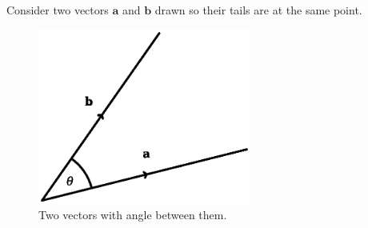 \documentclass[12pt,a4paper]{article}
\newcommand{\gm}{0.625}
\newcommand{\gm}{0.5}
\newcommand{\nextalt}[1]{}
\theoremstyle{clearprint}
\newcommand{\bvec}[1]{\mathrm{\mathbf{#1}}}
\begin{document}
Consider two vectors \(\bvec{a}\) and \(\bvec{b}\) drawn so their tails are at the same point. 
\begin{figure}[!h]
\begin{center}
\nextalt{Two vectors, labelled a and b, are drawn as line segments. Their start points coincide and their end points do not. There is an acute angle of theta between them. Each line segment has an arrow on it pointing from the start point to the end point.}
\includegraphics[width=\gm\textwidth]{vectors.eps}
\end{center}
\caption{Two vectors with angle between them.}
\label{vectors}
\end{figure}
\end{document}
